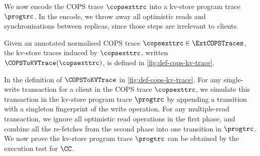 We now encode the COPS trace \( \copsexttrc \) into a kv-store program trace \( \progtrc \).
In the encode, we throw away all optimistic reads and synchronisations between replicas,
since those steps are irrelevant to clients.

\begin{definition}
\label{def:cops-kv-store-trace}
Given an annotated normalised COPS trace \( \copsexttrc \in \ExtCOPSTraces \),
the kv-store traces induced by \( \copsexttrc \),
written \( \COPSToKVTrace(\copsexttrc) \), is defined in \cref{fig:def-cops-kv-trace}.
\end{definition}

In the definition of \( \COPSToKVTrace \) in \cref{fig:def-cops-kv-trace}.
For any single-write transaction for a client in the COPS trace \( \copsexttrc \),
we simulate this transaction in the kv-store program trace \( \progtrc \)
by appending a transition with a singleton fingerprint of the write operation.
For any multiple-read transaction, we ignore all optimistic read operations in the first phase, 
and combine all the re-fetches from the second phase into one transition in \( \progtrc \).
We now prove the kv-store program trace \( \progtrc \) can be obtained by the execution test for \( \CC \).


